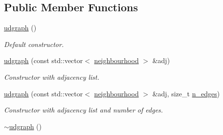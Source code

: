 \subsection*{Public Member Functions}
\begin{DoxyCompactItemize}
\item 
\hypertarget{classlgraph_1_1udgraph_a19ec9ed8612253406313887f159ab428}{\hyperlink{classlgraph_1_1udgraph_a19ec9ed8612253406313887f159ab428}{udgraph} ()}\label{classlgraph_1_1udgraph_a19ec9ed8612253406313887f159ab428}

\begin{DoxyCompactList}\small\item\em Default constructor. \end{DoxyCompactList}\item 
\hyperlink{classlgraph_1_1udgraph_a1cb1f1872b9274c9a9253b7c6e516607}{udgraph} (const std\-::vector$<$ \hyperlink{namespacelgraph_a052e7766c13f3a43cec0aec8173fdede}{neighbourhood} $>$ \&adj)
\begin{DoxyCompactList}\small\item\em Constructor with adjacency list. \end{DoxyCompactList}\item 
\hyperlink{classlgraph_1_1udgraph_a84bb75d8ec5b2621af504e7f7d843827}{udgraph} (const std\-::vector$<$ \hyperlink{namespacelgraph_a052e7766c13f3a43cec0aec8173fdede}{neighbourhood} $>$ \&adj, size\-\_\-t \hyperlink{classlgraph_1_1xxgraph_a8ca991d1521cb6ba77e1cd3494ab42be}{n\-\_\-edges})
\begin{DoxyCompactList}\small\item\em Constructor with adjacency list and number of edges. \end{DoxyCompactList}\item 
\hypertarget{classlgraph_1_1udgraph_a5d2d9e53db51d722f91a740a1a9c5825}{\hyperlink{classlgraph_1_1udgraph_a5d2d9e53db51d722f91a740a1a9c5825}{$\sim$udgraph} ()}\label{classlgraph_1_1udgraph_a5d2d9e53db51d722f91a740a1a9c5825}


\end{DoxyCompactItemize}

